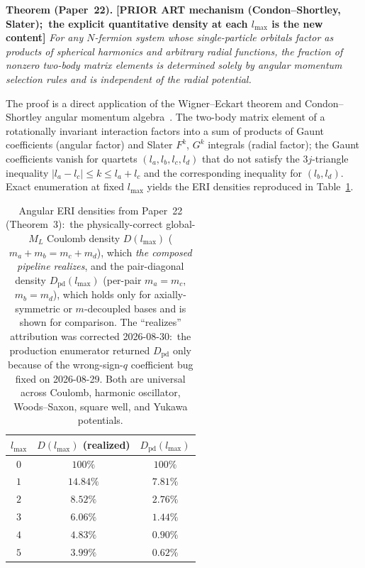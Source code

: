 \documentclass[aps,pra,twocolumn,superscriptaddress,longbibliography]{revtex4-2}
\begin{document}
\medskip
\noindent\textbf{Theorem (Paper~22).}  \textbf{[PRIOR ART mechanism
(Condon--Shortley, Slater);\ the explicit quantitative density at each
$l_{\max}$ is the new content]} \emph{For any $N$-fermion
system whose single-particle orbitals factor as products of spherical
harmonics and arbitrary radial functions, the fraction of nonzero
two-body matrix elements is determined solely by angular momentum
selection rules and is independent of the radial potential.}

\medskip

The proof is a direct application of the Wigner--Eckart theorem and
Condon--Shortley angular momentum
algebra~\cite{CondonShortley1935, Slater1960}.  The two-body matrix
element of a rotationally invariant interaction factors into a sum of
products of Gaunt coefficients (angular factor) and Slater $F^k$,
$G^k$ integrals (radial factor); the Gaunt coefficients vanish for
quartets $(l_a, l_b, l_c, l_d)$ that do not satisfy the
$3j$-triangle inequality
$|l_a - l_c| \le k \le l_a + l_c$ and the corresponding inequality
for $(l_b, l_d)$.  Exact enumeration at fixed $l_{\max}$ yields the
ERI densities reproduced in Table~\ref{tab:eri_density}.

\begin{table}[t]
\centering
\caption{Angular ERI densities from Paper~22 (Theorem~3):\ the
physically-correct global-$M_L$ Coulomb density $D(l_{\max})$
($m_a + m_b = m_c + m_d$), which \emph{the composed pipeline realizes},
and the pair-diagonal density $D_{\mathrm{pd}}(l_{\max})$ (per-pair
$m_a=m_c$, $m_b=m_d$), which holds only for axially-symmetric or
$m$-decoupled bases and is shown for comparison.  The
``realizes'' attribution was corrected 2026-08-30:\ the production
enumerator returned $D_{\mathrm{pd}}$ only because of the wrong-sign-$q$
coefficient bug fixed on 2026-08-29.  Both are universal across Coulomb,
harmonic oscillator, Woods--Saxon, square well, and Yukawa
potentials.}
\label{tab:eri_density}
\begin{tabular}{c c c}
\toprule
$l_{\max}$ & $D(l_{\max})$ (realized) & $D_{\mathrm{pd}}(l_{\max})$ \\
\midrule
$0$ & $100\%$ & $100\%$ \\
$1$ & $14.84\%$ & $7.81\%$ \\
$2$ & $8.52\%$ & $2.76\%$ \\
$3$ & $6.06\%$ & $1.44\%$ \\
$4$ & $4.83\%$ & $0.90\%$ \\
$5$ & $3.99\%$ & $0.62\%$ \\
\bottomrule
\end{tabular}
\end{table}
\end{document}
